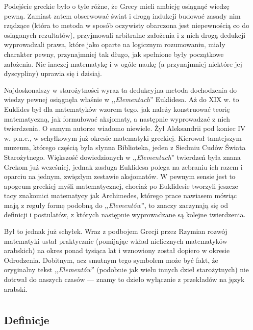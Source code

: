 \documentclass[12pt, a4paper]{scrartcl}
\begin{document}
Podejście greckie było o tyle różne, że Grecy mieli ambicję osiągnąć wiedzę
pewną. Zamiast zatem obserwować świat i drogą indukcji budować zasady
nim rządzące (która to metoda w sposób oczywisty obarczona jest niepewnością
co do osiąganych rezultatów), przyjmowali arbitralne założenia i z nich drogą
dedukcji wyprowadzali prawa, które jako oparte na logicznym rozumowaniu, miały
charakter pewny, przynajmniej tak długo, jak spełnione były początkowe
założenia. Nie inaczej matematykę i w ogóle naukę (a przynajmniej niektóre jej
dyscypliny) uprawia się i dzisiaj.

Najdoskonalszy w starożytności wyraz ta dedukcyjna metoda dochodzenia do wiedzy
pewnej osiągnęła właśnie w ,,\emph{Elementach}'' Euklidesa. Aż do XIX w. to
Euklides był dla matematyków wzorem tego, jak należy konstruować teorię
matematyczną, jak formułować aksjomaty, a następnie wyprowadzać z nich
twierdzenia. O samym autorze wiadomo niewiele. Żył Aleksandrii pod koniec IV w.
p.n.e., w schyłkowym już okresie matematyki greckiej. Kierował tamtejszym
muzeum, którego częścią była słynna Biblioteka, jeden z Siedmiu Cudów Świata
Starożytnego. Większość dowiedzionych w ,,\emph{Elementach}'' twierdzeń była
znana Grekom już wcześniej, jednak zasługa Euklidesa polega na zebraniu ich
razem i oparciu na jednym, zwięzłym zestawie aksjomatów. W pewnym sensie jest to
apogeum greckiej myśli matematycznej, chociaż po Euklidesie tworzyli jeszcze
tacy znakomici matematycy jak Archimedes, którego prace nawiasem mówiąc mają z
reguły formę podobną do ,,\emph{Elementów}'', to znaczy zaczynają się od
definicji i postulatów, z których następnie wyprowadzane są kolejne twierdzenia.

Był to jednak już schyłek. Wraz z podbojem Grecji przez Rzymian rozwój
matematyki ustał praktycznie (pomijając wkład nielicznych matematyków arabskich)
na okres ponad tysiąca lat i wznowiony został dopiero w okresie Odrodzenia.
Dobitnym, acz smutnym tego symbolem może być fakt, że oryginalny tekst
,,\emph{Elementów}'' (podobnie jak wielu innych dzieł starożytnych) nie dotrwał
do naszych czasów --- znamy to dzieło wyłącznie z przekładów na język arabski.

\pagebreak

\section{}
\subsection*{Definicje}
\end{document}
